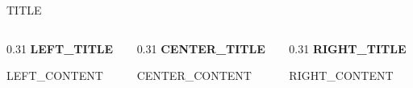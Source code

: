 
\begin{frame}{{{TITLE}}}
    \begin{columns}[T]
        \begin{column}{0.31\textwidth}
            \textbf{{LEFT_TITLE}}
            
            \vspace{0.5em}
            {{LEFT_CONTENT}}
        \end{column}
        
        \begin{column}{0.31\textwidth}
            \textbf{{CENTER_TITLE}}
            
            \vspace{0.5em}
            {{CENTER_CONTENT}}
        \end{column}
        
        \begin{column}{0.31\textwidth}
            \textbf{{RIGHT_TITLE}}
            
            \vspace{0.5em}
            {{RIGHT_CONTENT}}
        \end{column}
    \end{columns}
\end{frame}
